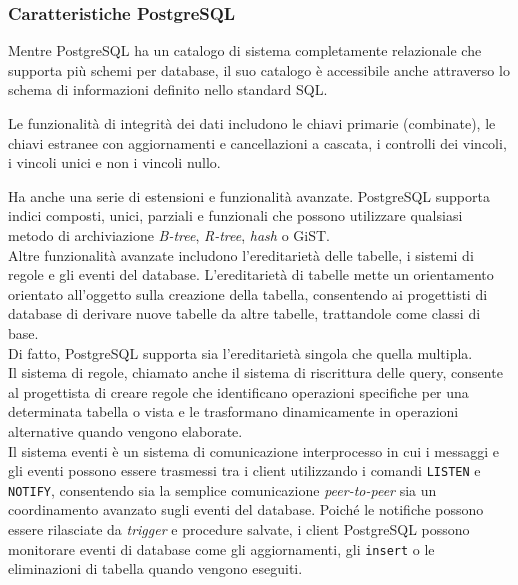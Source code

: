 \subsubsection{Caratteristiche PostgreSQL}
Mentre PostgreSQL ha un catalogo di sistema completamente relazionale che supporta pi\`{u} schemi per database, il suo catalogo \`{e} accessibile anche attraverso lo schema di informazioni definito nello standard SQL.

Le funzionalit\`{a} di integrit\`{a} dei dati includono le chiavi primarie (combinate), le chiavi estranee con aggiornamenti e cancellazioni a cascata, i controlli dei vincoli, i vincoli unici e non i vincoli nullo.

Ha anche una serie di estensioni e funzionalit\`{a} avanzate. PostgreSQL supporta indici composti, unici, parziali e funzionali che possono utilizzare qualsiasi metodo di archiviazione \textit{B-tree}, \textit{R-tree}, \textit{hash} o GiST\cite{etichetta15}.\\

Altre funzionalit\`{a} avanzate includono l'ereditariet\`{a} delle tabelle, i sistemi di regole e gli eventi del database. L'ereditariet\`{a} di tabelle mette un orientamento orientato all'oggetto sulla creazione della tabella, consentendo ai progettisti di database di derivare nuove tabelle da altre tabelle, trattandole come classi di base.\\
Di fatto, PostgreSQL supporta sia l'ereditariet\`{a} singola che quella multipla.\\

Il sistema di regole, chiamato anche il sistema di riscrittura delle query, consente al progettista di creare regole che identificano operazioni specifiche per una determinata tabella o vista e le trasformano dinamicamente in operazioni alternative quando vengono elaborate.\\
Il sistema eventi \`{e} un sistema di comunicazione interprocesso in cui i messaggi e gli eventi possono essere trasmessi tra i client utilizzando i comandi \verb"LISTEN" e \verb"NOTIFY", consentendo sia la semplice comunicazione \textit{peer-to-peer} sia un coordinamento avanzato sugli eventi del database. Poich\'{e} le notifiche possono essere rilasciate da \textit{trigger} e procedure salvate, i client PostgreSQL possono monitorare eventi di database come gli aggiornamenti, gli \verb"insert" o le eliminazioni di tabella quando vengono eseguiti\cite{etichetta15}.

